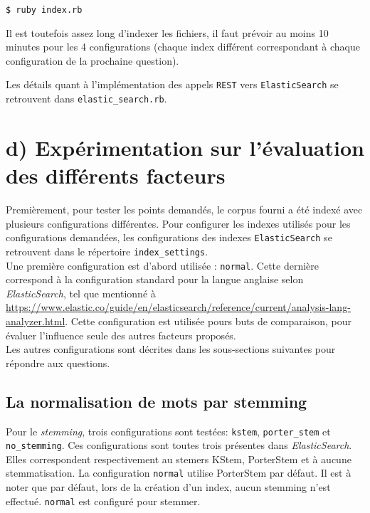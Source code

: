 \documentclass[12pt]{article}
\begin{document}
\begin{verbatim}
$ ruby index.rb
\end{verbatim}

Il est toutefois assez long d'indexer les fichiers, il faut prévoir au moins 10 minutes pour les 4 configurations (chaque index différent correspondant à chaque configuration de la prochaine question).

Les détails quant à l'implémentation des appels \verb;REST; vers \verb;ElasticSearch; se retrouvent dans \verb;elastic_search.rb;.

\section{d) Expérimentation sur l'évaluation des différents facteurs}
Premièrement, pour tester les points demandés, le corpus fourni a été indexé avec plusieurs configurations différentes. Pour configurer les indexes utilisés pour les configurations demandées, les configurations des indexes \verb;ElasticSearch; se retrouvent dans le répertoire \verb;index_settings;.\\

Une première configuration est d'abord utilisée : \verb;normal;. Cette dernière correspond à la configuration standard pour la langue anglaise selon \textit{ElasticSearch}, tel que mentionné à \url{https://www.elastic.co/guide/en/elasticsearch/reference/current/analysis-lang-analyzer.html}. Cette configuration est utilisée pours buts de comparaison, pour évaluer l'influence seule des autres facteurs proposés.\\

Les autres configurations sont décrites dans les sous-sections suivantes pour répondre aux questions.

\subsection{La normalisation de mots par stemming}
Pour le \textit{stemming}, trois configurations sont testées: \verb;kstem;, \verb;porter_stem; et \verb;no_stemming;. Ces configurations sont toutes trois présentes dans \textit{ElasticSearch}. Elles correspondent respectivement au stemers KStem, PorterStem et à aucune stemmatisation. La configuration \verb;normal; utilise PorterStem par défaut. Il est à noter que par défaut, lors de la création d'un index, aucun stemming n'est effectué. \verb;normal; est configuré pour stemmer.\\
\end{document}
